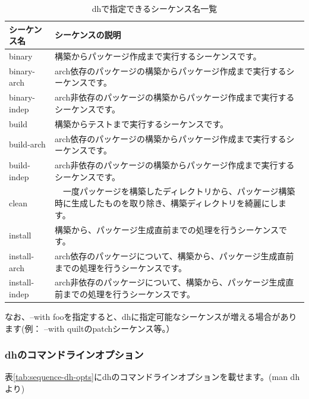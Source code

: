 \documentclass[mingoth,a4paper]{jsarticle}
\begin{document}
\begin{table}[ht]
\begin{center}
\small
\begin{tabular}{|p{8em}|p{35em}|}
\hline
シーケンス名&シーケンスの説明 \\
\hline
binary & 構築からパッケージ作成まで実行するシーケンスです。\\
binary-arch & arch依存のパッケージの構築からパッケージ作成まで実行するシーケンスです。\\
binary-indep & arch非依存のパッケージの構築からパッケージ作成まで実行するシーケンスです。\\
build & 構築からテストまで実行するシーケンスです。\\
build-arch & arch依存のパッケージの構築からパッケージ作成まで実行するシーケンスです。\\
build-indep & arch非依存のパッケージの構築からパッケージ作成まで実行するシーケンスです。\\
clean &　一度パッケージを構築したディレクトリから、パッケージ構築時に生成したものを取り除き、構築ディレクトリを綺麗にします。\\
install & 構築から、パッケージ生成直前までの処理を行うシーケンスです。\\
install-arch & arch依存のパッケージについて、構築から、パッケージ生成直前までの処理を行うシーケンスです。\\
install-indep & arch非依存のパッケージについて、構築から、パッケージ生成直前までの処理を行うシーケンスです。\\
\hline
\end{tabular}
\caption{dhで指定できるシーケンス名一覧}
\label{tab:sequence-dh-name}
\end{center}
\end{table}

なお、--with fooを指定すると、dhに指定可能なシーケンスが増える場合があります(例： --with quiltのpatchシーケンス等。）

\subsubsection{dhのコマンドラインオプション}

表\ref{tab:sequence-dh-opts}にdhのコマンドラインオプションを載せます。(man dhより)
\end{document}
